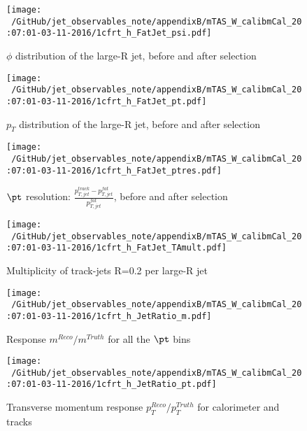 \begin{figure}
 
\texttt{[image: ~/GitHub/jet\_observables\_note/appendixB/mTAS\_W\_calibmCal\_20:07:01-03-11-2016/1cfrt\_h\_FatJet\_psi.pdf]}
\caption{$\phi$ distribution of the large-R jet, before and after selection}
 
\end{figure}
 
\begin{figure}
 
\texttt{[image: ~/GitHub/jet\_observables\_note/appendixB/mTAS\_W\_calibmCal\_20:07:01-03-11-2016/1cfrt\_h\_FatJet\_pt.pdf]}
\caption{$p_{T}$ distribution of the large-R jet, before and after selection}
 
\end{figure}
 
\begin{figure}
 
\texttt{[image: ~/GitHub/jet\_observables\_note/appendixB/mTAS\_W\_calibmCal\_20:07:01-03-11-2016/1cfrt\_h\_FatJet\_ptres.pdf]}
\caption{$\pt$ resolution: $\frac{p_{T,jet}^{track}-p_{T,jet}^{fat}}{p_{T,jet}^{fat}}$, before and after selection }
 
\end{figure}
 
\begin{figure}
 
\texttt{[image: ~/GitHub/jet\_observables\_note/appendixB/mTAS\_W\_calibmCal\_20:07:01-03-11-2016/1cfrt\_h\_FatJet\_TAmult.pdf]}
\caption{Multiplicity of track-jets R=0.2 per large-R jet}
 
\end{figure}
\begin{figure}
 
\texttt{[image: ~/GitHub/jet\_observables\_note/appendixB/mTAS\_W\_calibmCal\_20:07:01-03-11-2016/1cfrt\_h\_JetRatio\_m.pdf]}
\caption{Response $m^{Reco} / m^{Truth}$ for all the $\pt$ bins}
 
\end{figure}
 
\begin{figure}
 
\texttt{[image: ~/GitHub/jet\_observables\_note/appendixB/mTAS\_W\_calibmCal\_20:07:01-03-11-2016/1cfrt\_h\_JetRatio\_pt.pdf]}
\caption{Transverse momentum response $p_{T}^{Reco} / p_{T}^{Truth}$ for calorimeter and tracks}
 
\end{figure}
 

